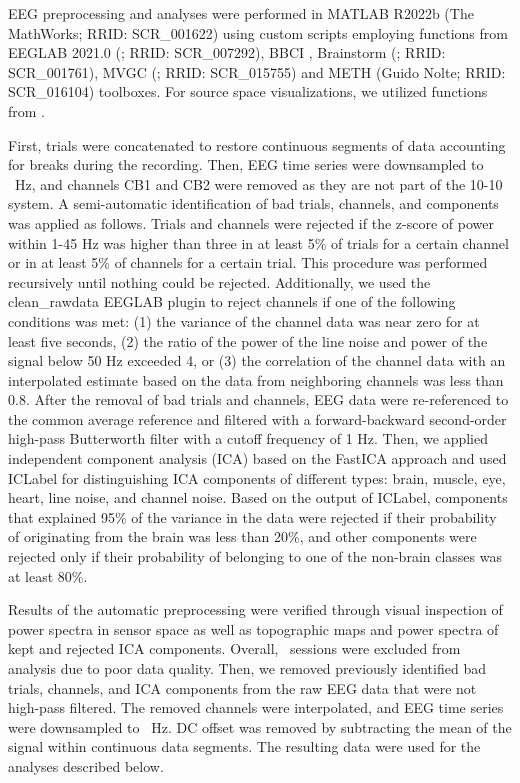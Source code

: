 EEG preprocessing and analyses were performed in MATLAB R2022b (The MathWorks; RRID: SCR\_001622) using custom scripts employing functions from EEGLAB 2021.0 (\cite{EEGLAB_Delorme2004}; RRID: SCR\_007292), BBCI \citep{Blankertz2016}, Brainstorm (\cite{Brainstorm_Tadel2011}; RRID: SCR\_001761), MVGC (\cite{MVGC_Barnett2014}; RRID: SCR\_015755) and METH (Guido Nolte; RRID: SCR\_016104) toolboxes. For source space visualizations, we utilized functions from \citep{HaufeEwald2019}.

\medskip

First, trials were concatenated to restore continuous segments of data accounting for breaks during the recording. Then, EEG time series were downsampled to \downsampleFreq~Hz, and channels CB1 and CB2 were removed as they are not part of the 10-10 system. A semi-automatic identification of bad trials, channels, and components was applied as follows. Trials and channels were rejected if the z-score of power within 1-45 Hz was higher than three in at least 5\% of trials for a certain channel or in at least 5\% of channels for a certain trial. This procedure was performed recursively until nothing could be rejected. Additionally, we used the clean\_rawdata EEGLAB plugin to reject channels if one of the following conditions was met: (1) the variance of the channel data was near zero for at least five seconds, (2) the ratio of the power of the line noise and power of the signal below 50 Hz exceeded 4, or (3) the correlation of the channel data with an interpolated estimate based on the data from neighboring channels was less than 0.8. After the removal of bad trials and channels, EEG data were re-referenced to the common average reference and filtered with a forward-backward second-order high-pass Butterworth filter with a cutoff frequency of 1 Hz. Then, we applied independent component analysis (ICA) based on the FastICA approach \citep{FastICA_Hyvaerinen1999} and used ICLabel \citep{ICLabel_PionTonachini2019} for distinguishing ICA components of different types: brain, muscle, eye, heart, line noise, and channel noise. Based on the output of ICLabel, components that explained 95\% of the variance in the data were rejected if their probability of originating from the brain was less than 20\%, and other components were rejected only if their probability of belonging to one of the non-brain classes was at least 80\%.

\medskip

Results of the automatic preprocessing were verified through visual inspection of power spectra in sensor space as well as topographic maps and power spectra of kept and rejected ICA components. Overall, \numSessionsExcluded~sessions were excluded from analysis due to poor data quality. Then, we removed previously identified bad trials, channels, and ICA components from the raw EEG data that were not high-pass filtered. The removed channels were interpolated, and EEG time series were downsampled to \downsampleFreq~Hz. DC offset was removed by subtracting the mean of the signal within continuous data segments. The resulting data were used for the analyses described below.

